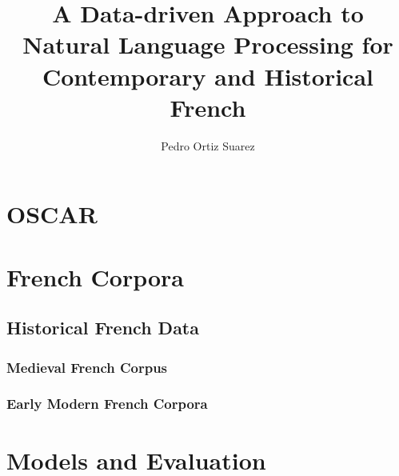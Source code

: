 \documentclass{mimosis}
\title{A Data-driven Approach to Natural Language Processing for Contemporary and Historical French}
\author{Pedro Ortiz Suarez}
\begin{document}
\frontmatter

% 

\tableofcontents

\mainmatter







\part{OSCAR}






\part{French Corpora}

\chapter{Historical French Data}
\section{Medieval French Corpus}
\section{Early Modern French Corpora}

\part{Models and Evaluation}







\appendix









\backmatter

\begingroup
\let\clearpage\relax
\glsaddall
\printglossary[type=\acronymtype]
\newpage
\printglossary
\endgroup

\printindex





\end{document}
